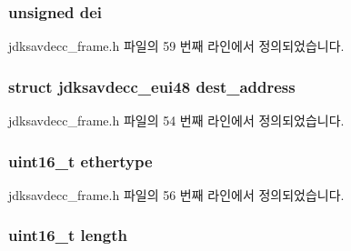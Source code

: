 \subsubsection[{\texorpdfstring{dei}{dei}}]{\setlength{\rightskip}{0pt plus 5cm}unsigned dei}\hypertarget{structjdksavdecc__frame_a160cefca2111b7985c1ad181297c0a90}{}\label{structjdksavdecc__frame_a160cefca2111b7985c1ad181297c0a90}


jdksavdecc\+\_\+frame.\+h 파일의 59 번째 라인에서 정의되었습니다.

\subsubsection[{\texorpdfstring{dest\+\_\+address}{dest_address}}]{\setlength{\rightskip}{0pt plus 5cm}struct {\bf jdksavdecc\+\_\+eui48} dest\+\_\+address}\hypertarget{structjdksavdecc__frame_a104d37031c593f66765dc66d8ac8962b}{}\label{structjdksavdecc__frame_a104d37031c593f66765dc66d8ac8962b}


jdksavdecc\+\_\+frame.\+h 파일의 54 번째 라인에서 정의되었습니다.

\subsubsection[{\texorpdfstring{ethertype}{ethertype}}]{\setlength{\rightskip}{0pt plus 5cm}uint16\+\_\+t ethertype}\hypertarget{structjdksavdecc__frame_aa9296c58dc24c63c4ee927db394a97d7}{}\label{structjdksavdecc__frame_aa9296c58dc24c63c4ee927db394a97d7}


jdksavdecc\+\_\+frame.\+h 파일의 56 번째 라인에서 정의되었습니다.

\subsubsection[{\texorpdfstring{length}{length}}]{\setlength{\rightskip}{0pt plus 5cm}uint16\+\_\+t length}\hypertarget{structjdksavdecc__frame_a1892eba2086d12ac2b09005aeb09ea3b}{}\label{structjdksavdecc__frame_a1892eba2086d12ac2b09005aeb09ea3b}


